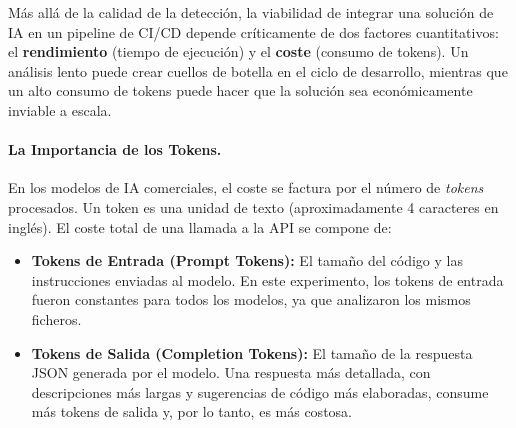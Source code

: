 Más allá de la calidad de la detección, la viabilidad de integrar una solución de IA en un pipeline de CI/CD depende críticamente de dos factores cuantitativos: el \textbf{rendimiento} (tiempo de ejecución) y el \textbf{coste} (consumo de tokens). Un análisis lento puede crear cuellos de botella en el ciclo de desarrollo, mientras que un alto consumo de tokens puede hacer que la solución sea económicamente inviable a escala.

\paragraph{La Importancia de los Tokens.} En los modelos de IA comerciales, el coste se factura por el número de \textit{tokens} procesados. Un token es una unidad de texto (aproximadamente 4 caracteres en inglés). El coste total de una llamada a la API se compone de:
\begin{itemize}
    \item \textbf{Tokens de Entrada (Prompt Tokens):} El tamaño del código y las instrucciones enviadas al modelo. En este experimento, los tokens de entrada fueron constantes para todos los modelos, ya que analizaron los mismos ficheros.
    \item \textbf{Tokens de Salida (Completion Tokens):} El tamaño de la respuesta JSON generada por el modelo. Una respuesta más detallada, con descripciones más largas y sugerencias de código más elaboradas, consume más tokens de salida y, por lo tanto, es más costosa.
\end{itemize}

